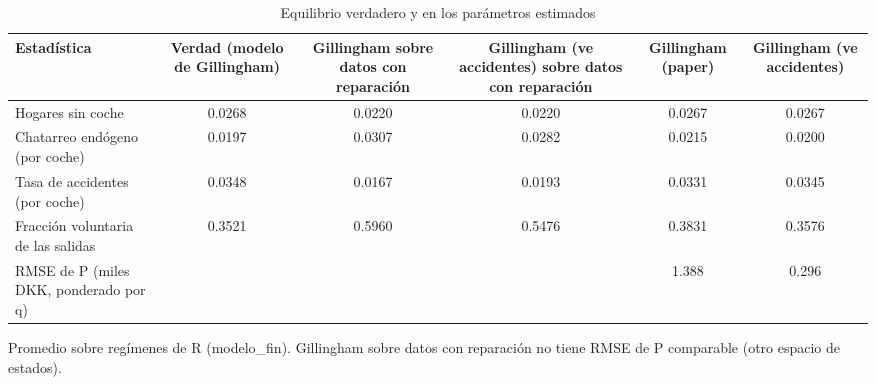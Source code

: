 \begin{table}[htbp]
\centering
\caption{Equilibrio verdadero y en los parámetros estimados}
\begin{tabular}{lccccc}
\toprule
Estadística & Verdad (modelo de Gillingham) & Gillingham sobre datos con reparación & Gillingham (ve accidentes) sobre datos con reparación & Gillingham (paper) & Gillingham (ve accidentes) \\
\midrule
Hogares sin coche & 0.0268 & 0.0220 & 0.0220 & 0.0267 & 0.0267 \\
Chatarreo endógeno (por coche) & 0.0197 & 0.0307 & 0.0282 & 0.0215 & 0.0200 \\
Tasa de accidentes (por coche) & 0.0348 & 0.0167 & 0.0193 & 0.0331 & 0.0345 \\
Fracción voluntaria de las salidas & 0.3521 & 0.5960 & 0.5476 & 0.3831 & 0.3576 \\
RMSE de P (miles DKK, ponderado por q) &  &  &  & 1.388 & 0.296 \\
\bottomrule
\end{tabular}
\par\smallskip\footnotesize Promedio sobre regímenes de R (modelo\_fin). Gillingham sobre datos con reparación no tiene RMSE de P comparable (otro espacio de estados).
\end{table}
